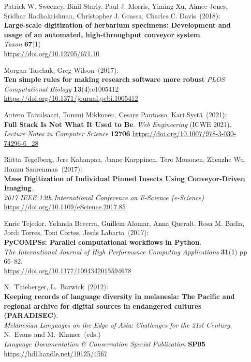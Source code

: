 \begin{thebibliography}{9}
Patrick W. Sweeney, Binil Starly, Paul J. Morris, Yiming Xu, Aimee Jones, Sridhar Radhakrishnan, Christopher J. Grassa, Charles C. Davis~(2018): \\
\textbf{Large-scale digitization of herbarium specimens: Development and usage of an
automated, high-throughput conveyor system}.\\
\emph{Taxon} \textbf{67}(1)\\
\url{https://doi.org/10.12705/671.10}

Morgan Taschuk, Greg Wilson~(2017):\\
\textbf{Ten simple rules for making research software more robust}
\emph{PLOS Computational Biology} \textbf{13}(4):e1005412
\url{https://doi.org/10.1371/journal.pcbi.1005412}

Antero Taivalsaari, Tommi Mikkonen, Cesare Pautasso, Kari Systä~(2021): \\
\textbf{Full Stack Is Not What It Used to Be}.
\emph{Web Engineering} (ICWE 2021).\\
\emph{Lecture Notes in Computer Science} \textbf{12706}
\url{https://doi.org/10.1007/978-3-030-74296-6_28}

Riitta Tegelberg, Jere Kahanpaa, Janne Karppinen, Tero Mononen, Zhenzhe Wu, Hannu Saarenmaa~(2017): \\
\textbf{Mass Digitization of Individual Pinned Insects Using Conveyor-Driven Imaging}.\\
\emph{2017 IEEE 13th International Conference on E-Science (e-Science)}\\
\url{https://doi.org/10.1109/eScience.2017.85}

Enric Tejedor, Yolanda Becerra, Guillem Alomar, Anna Queralt,
Rosa M. Badia, Jordi Torres, Toni Cortes, Jesús Labarta~(2017): \\
\textbf{PyCOMPSs: Parallel computational workflows in Python}.\\
\emph{The International Journal of High Performance Computing Applications}
\textbf{31}(1) pp 66--82.\\
\url{https://doi.org/10.1177/1094342015594678}

N.~Thieberger, L.~Barwick~(2012): \\
\textbf{Keeping records of language diversity in melanesia: The Pacific
and regional archive for digital sources in endangered cultures
(PARADISEC)}.\\
\emph{Melanesian Languages on the Edge of Asia:
Challenges for the 21st Century}, N.~Evans and M.~Klamer~(eds.)\\
\emph{Language Documentation \& Conservation Special Publication}
\textbf{SP05} \\
\url{https://hdl.handle.net/10125/4567}


\end{thebibliography}
